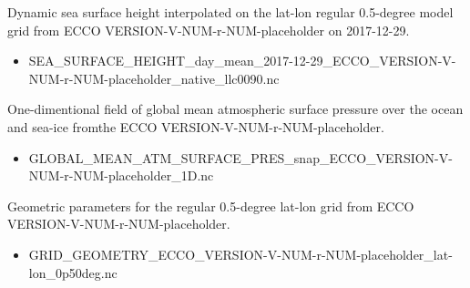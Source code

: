 \par Dynamic sea surface height interpolated on the lat-lon regular 0.5-degree model grid from ECCO VERSION-V-NUM-r-NUM-placeholder on 2017-12-29.

\begin{itemize}
    \item SEA\_SURFACE\_HEIGHT\_day\_mean\_2017-12-29\_ECCO\_VERSION-V-NUM-r-NUM-placeholder\_native\_llc0090.nc
\end{itemize}

\par One-dimentional field of global mean atmospheric surface pressure over the ocean and sea-ice fromthe ECCO VERSION-V-NUM-r-NUM-placeholder.
\begin{itemize}
    \item GLOBAL\_MEAN\_ATM\_SURFACE\_PRES\_snap\_ECCO\_VERSION-V-NUM-r-NUM-placeholder\_1D.nc
\end{itemize}

\par Geometric parameters for the regular 0.5-degree lat-lon grid from ECCO VERSION-V-NUM-r-NUM-placeholder.
\begin{itemize}
    \item GRID\_GEOMETRY\_ECCO\_VERSION-V-NUM-r-NUM-placeholder\_lat-lon\_0p50deg.nc
\end{itemize}
